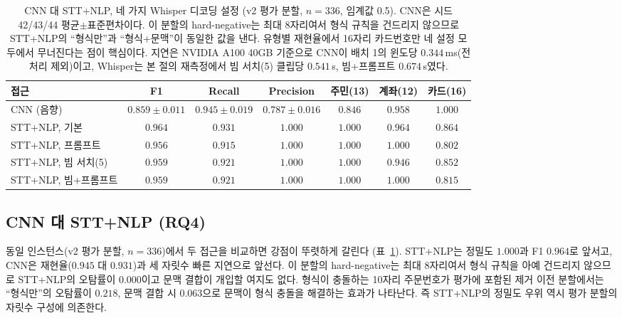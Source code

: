 \documentclass[10pt,twocolumn]{article}
\begin{document}
\begin{table}[!t]
\centering
\caption{CNN 대 STT+NLP, 네 가지 Whisper 디코딩 설정 (v2 평가 분할, $n=336$, 임계값 0.5).
CNN은 시드 42/43/44 평균$\pm$표준편차이다. 이 분할의 hard-negative는 최대 8자리여서 형식 규칙을
건드리지 않으므로 STT+NLP의 ``형식만''과 ``형식+문맥''이 동일한 값을 낸다. 유형별 재현율에서
16자리 카드번호만 네 설정 모두에서 무너진다는 점이 핵심이다. 지연은 NVIDIA A100 40GB 기준으로
CNN이 배치 1의 윈도당 $0.344$\,ms(전처리 제외)이고, Whisper는 본 절의 재측정에서 빔 서치(5)
클립당 $0.541$\,s, 빔+프롬프트 $0.674$\,s였다.}
\label{tab:vs}
\small
\setlength{\tabcolsep}{6pt}
\begin{tabular}{lcccccc}
\toprule
접근 & F1 & Recall & Precision & 주민(13) & 계좌(12) & 카드(16) \\
\midrule
CNN (음향) & $0.859\pm0.011$ & $\mathbf{0.945\pm0.019}$ & $0.787\pm0.016$ & $0.846$ & $0.958$ & $\mathbf{1.000}$ \\
\midrule
STT+NLP, 기본        & $\mathbf{0.964}$ & $0.931$ & $\mathbf{1.000}$ & $1.000$ & $0.964$ & $0.864$ \\
STT+NLP, 프롬프트    & $0.956$ & $0.915$ & $\mathbf{1.000}$ & $1.000$ & $1.000$ & $0.802$ \\
STT+NLP, 빔 서치(5)  & $0.959$ & $0.921$ & $\mathbf{1.000}$ & $1.000$ & $0.946$ & $0.852$ \\
STT+NLP, 빔+프롬프트 & $0.959$ & $0.921$ & $\mathbf{1.000}$ & $1.000$ & $1.000$ & $0.815$ \\
\bottomrule
\end{tabular}
\end{table}

\subsection{CNN 대 STT+NLP (RQ4)}
동일 인스턴스(v2 평가 분할, $n=336$)에서 두 접근을 비교하면 강점이 뚜렷하게 갈린다
(표~\ref{tab:vs}). STT+NLP는 정밀도 $1.000$과 F1 $0.964$로 앞서고, CNN은 재현율($0.945$ 대
$0.931$)과 세 자릿수 빠른 지연으로 앞선다. 이 분할의 hard-negative는 최대 8자리여서 형식 규칙을
아예 건드리지 않으므로 STT+NLP의 오탐률이 $0.000$이고 문맥 결합이 개입할 여지도 없다. 형식이
충돌하는 10자리 주문번호가 평가에 포함된 제거 이전 분할에서는 ``형식만''의 오탐률이 $0.218$,
문맥 결합 시 $0.063$으로 문맥이 형식 충돌을 해결하는 효과가 나타난다. 즉 STT+NLP의 정밀도 우위
역시 평가 분할의 자릿수 구성에 의존한다.
\end{document}
